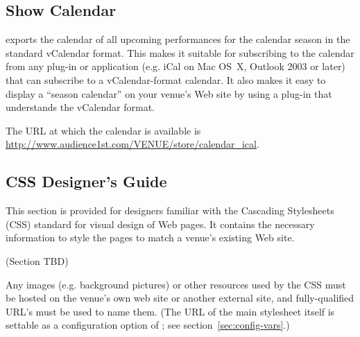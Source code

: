 \subsection{Show Calendar}
\label{sec:calendar}

\af exports the calendar of all upcoming performances for the calendar
season in the standard vCalendar format.  This makes it suitable for
subscribing to the calendar from any plug-in or application (e.g. iCal
on Mac OS~X, Outlook 2003 or later) that can subscribe to a
vCalendar-format calendar.  It also makes it easy to display a ``season
calendar'' on your venue's Web site by using a plug-in that understands
the vCalendar format.

The URL at which the calendar is available is
\url{http://www.audience1st.com/VENUE/store/calendar_ical}.

\subsection{CSS Designer's Guide}
\label{sec:creating_css}

This section is provided for designers familiar with the Cascading
Stylesheets (CSS) standard for visual design of Web pages.  It contains
the necessary information to style the \af pages to match a venue's
existing Web site.

(Section TBD)

Any images (e.g. background pictures) or other resources used by the CSS
must be hosted on the venue's own web site or another external site, and
fully-qualified URL's must be used to name them.  (The URL of the main
stylesheet itself is settable as a configuration option of \af; see
section~\ref{sec:config-vars}.)
